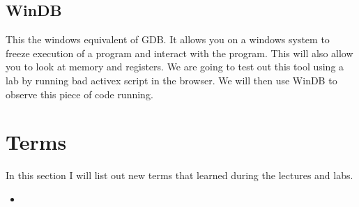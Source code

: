 \documentclass[letterpaper, onecolumn,10pt]{IEEEtran}
\begin{document}
		    \subsection{WinDB}
		    This the windows equivalent of GDB. It allows you on a windows system to freeze execution of a program and interact with the program. This will also allow you to look at memory and registers. We are going to test out this tool using a lab by running bad activex script in the browser. We will then use WinDB to observe this piece of code running.\\
		    
		    \subsection{}
		    
		
		
		\section{Terms}
		In this section I will list out new terms that learned during the lectures and labs.
		\begin{itemize}
		    \item 
		\end{itemize}
			
		
\end{document}
